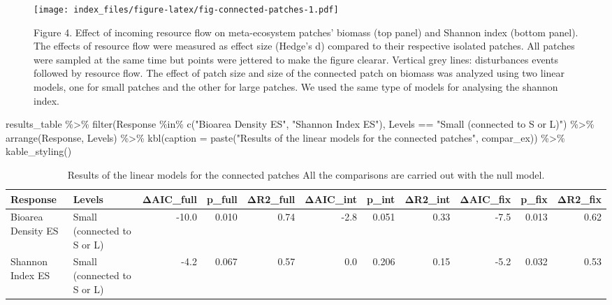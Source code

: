 \documentclass[
]{article}
\newenvironment{Shaded}{\begin{snugshade}}{\end{snugshade}}
\newcommand{\AttributeTok}[1]{\textcolor[rgb]{0.77,0.63,0.00}{#1}}
\newcommand{\FunctionTok}[1]{\textcolor[rgb]{0.00,0.00,0.00}{#1}}
\newcommand{\NormalTok}[1]{#1}
\newcommand{\SpecialCharTok}[1]{\textcolor[rgb]{0.00,0.00,0.00}{#1}}
\newcommand{\StringTok}[1]{\textcolor[rgb]{0.31,0.60,0.02}{#1}}
\begin{document}
\begin{figure}
\centering
\texttt{[image: index\_files/figure-latex/fig-connected-patches-1.pdf]}
\caption{Figure 4. Effect of incoming resource flow on meta-ecosystem
patches' biomass (top panel) and Shannon index (bottom panel). The
effects of resource flow were measured as effect size (Hedge's d)
compared to their respective isolated patches. All patches were sampled
at the same time but points were jettered to make the figure clearar.
Vertical grey lines: disturbances events followed by resource flow. The
effect of patch size and size of the connected patch on biomass was
analyzed using two linear models, one for small patches and the other
for large patches. We used the same type of models for analysing the
shannon index.}
\end{figure}

\begin{Shaded}
\begin{Highlighting}[]
\NormalTok{results\_table }\SpecialCharTok{\%\textgreater{}\%}
  \FunctionTok{filter}\NormalTok{(Response }\SpecialCharTok{\%in\%} \FunctionTok{c}\NormalTok{(}\StringTok{"Bioarea Density ES"}\NormalTok{, }
                         \StringTok{"Shannon Index ES"}\NormalTok{),}
\NormalTok{         Levels }\SpecialCharTok{==} \StringTok{"Small (connected to S or L)"}\NormalTok{) }\SpecialCharTok{\%\textgreater{}\%}
  \FunctionTok{arrange}\NormalTok{(Response, Levels) }\SpecialCharTok{\%\textgreater{}\%}
  \FunctionTok{kbl}\NormalTok{(}\AttributeTok{caption =} \FunctionTok{paste}\NormalTok{(}\StringTok{"Results of the linear models for the connected patches"}\NormalTok{, compar\_ex)) }\SpecialCharTok{\%\textgreater{}\%}
  \FunctionTok{kable\_styling}\NormalTok{()}
\end{Highlighting}
\end{Shaded}

\begin{table}

\caption{\label{tab:fig-connected-patches}Results of the linear models for the connected patches All the comparisons are carried out with the null model.}
\centering
\begin{tabular}[t]{l|l|r|r|r|r|r|r|r|r|r}
\hline
Response & Levels & ΔAIC\_full & p\_full & ΔR2\_full & ΔAIC\_int & p\_int & ΔR2\_int & ΔAIC\_fix & p\_fix & ΔR2\_fix\\
\hline
Bioarea Density ES & Small (connected to S or L) & -10.0 & 0.010 & 0.74 & -2.8 & 0.051 & 0.33 & -7.5 & 0.013 & 0.62\\
\hline
Shannon Index ES & Small (connected to S or L) & -4.2 & 0.067 & 0.57 & 0.0 & 0.206 & 0.15 & -5.2 & 0.032 & 0.53\\
\hline
\end{tabular}
\end{table}
\end{document}
